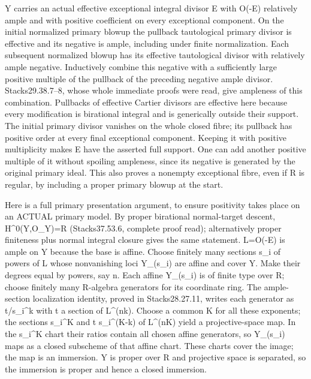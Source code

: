 Y carries an actual effective exceptional integral divisor E with O(-E) relatively ample and with positive coefficient on every exceptional component. On the initial normalized primary blowup the pullback tautological primary divisor is effective and its negative is ample, including under finite normalization. Each subsequent normalized blowup has its effective tautological divisor with relatively ample negative. Inductively combine this negative with a sufficiently large positive multiple of the pullback of the preceding negative ample divisor. Stacks29.38.7--8, whose whole immediate proofs were read, give ampleness of this combination. Pullbacks of effective Cartier divisors are effective here because every modification is birational integral and is generically outside their support. The initial primary divisor vanishes on the whole closed fibre; its pullback has positive order at every final exceptional component. Keeping it with positive multiplicity makes E have the asserted full support. One can add another positive multiple of it without spoiling ampleness, since its negative is generated by the original primary ideal. This also proves a nonempty exceptional fibre, even if R is regular, by including a proper primary blowup at the start.

Here is a full primary presentation argument, to ensure positivity takes place on an ACTUAL primary model. By proper birational normal-target descent, H\textasciicircum{}0(Y,O\_Y)=R (Stacks37.53.6, complete proof read); alternatively proper finiteness plus normal integral closure gives the same statement. L=O(-E) is ample on Y because the base is affine. Choose finitely many sections s\_i of powers of L whose nonvanishing loci Y\_(s\_i) are affine and cover Y. Make their degrees equal by powers, say n. Each affine Y\_(s\_i) is of finite type over R; choose finitely many R-algebra generators for its coordinate ring. The ample-section localization identity, proved in Stacks28.27.11, writes each generator as t/s\_i\textasciicircum{}k with t a section of L\textasciicircum{}(nk). Choose a common K for all these exponents; the sections s\_i\textasciicircum{}K and t s\_i\textasciicircum{}(K-k) of L\textasciicircum{}(nK) yield a projective-space map. In the s\_i\textasciicircum{}K chart their ratios contain all chosen affine generators, so Y\_(s\_i) maps as a closed subscheme of that affine chart. These charts cover the image; the map is an immersion. Y is proper over R and projective space is separated, so the immersion is proper and hence a closed immersion.

